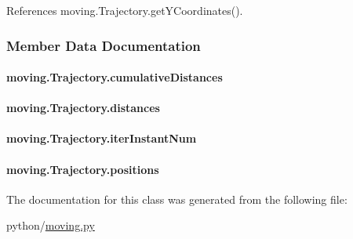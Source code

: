 References moving.\-Trajectory.\-get\-Y\-Coordinates().



\subsubsection{Member Data Documentation}
\hypertarget{classmoving_1_1Trajectory_a9546b3c74eb9958e3e0ed1f6389975ce}{
\paragraph[{cumulative\-Distances}]{\setlength{\rightskip}{0pt plus 5cm}moving.\-Trajectory.\-cumulative\-Distances}}\label{classmoving_1_1Trajectory_a9546b3c74eb9958e3e0ed1f6389975ce}
\hypertarget{classmoving_1_1Trajectory_aea4fefdcb7befe82e5c301da11897e74}{
\paragraph[{distances}]{\setlength{\rightskip}{0pt plus 5cm}moving.\-Trajectory.\-distances}}\label{classmoving_1_1Trajectory_aea4fefdcb7befe82e5c301da11897e74}
\hypertarget{classmoving_1_1Trajectory_afd8c6444a6674ebc78e365bd5fe3d9dc}{
\paragraph[{iter\-Instant\-Num}]{\setlength{\rightskip}{0pt plus 5cm}moving.\-Trajectory.\-iter\-Instant\-Num}}\label{classmoving_1_1Trajectory_afd8c6444a6674ebc78e365bd5fe3d9dc}
\hypertarget{classmoving_1_1Trajectory_ab6697c53341abdd8ceedf922a014a35a}{
\paragraph[{positions}]{\setlength{\rightskip}{0pt plus 5cm}moving.\-Trajectory.\-positions}}\label{classmoving_1_1Trajectory_ab6697c53341abdd8ceedf922a014a35a}


The documentation for this class was generated from the following file\-:\begin{DoxyCompactItemize}
\item 
python/\hyperlink{moving_8py}{moving.\-py}\end{DoxyCompactItemize}
